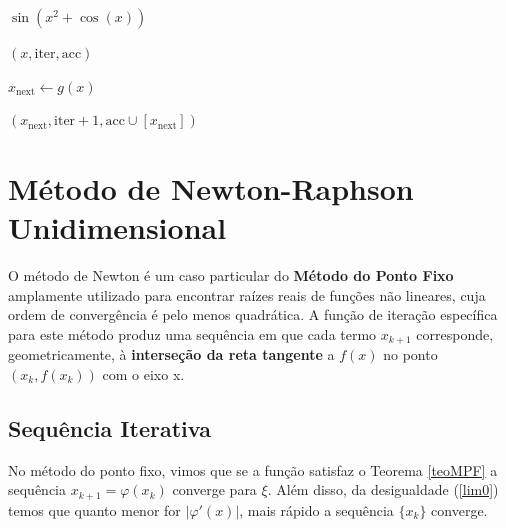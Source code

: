 \begin{algorithm}[H]
    \caption{Método do Ponto Fixo Recursivo}
    \label{alg:pontofixo_funcional}
    \begin{algorithmic}[1]
        \State \Return $\sin(x^2 + \cos(x))$
        \EndFunction


         
        \State \Return $(x, \text{iter}, \text{acc})$ 
        \EndIf

        \State $x_{\text{next}} \gets g(x)$

        \State \Return $(x_{\text{next}}, \text{iter} + 1, \text{acc} \cup [x_{\text{next}}])$ 
        \Else
        \State \Return {} 
        \EndIf
        \EndFunction

        \State \Return {} 
        \EndProcedure
    \end{algorithmic}
\end{algorithm}

\section{Método de Newton-Raphson Unidimensional}\label{sec:NR1d}




O método de Newton é um caso particular do \textbf{Método do Ponto Fixo}
amplamente utilizado para encontrar raízes reais de funções não lineares, cuja
ordem de convergência é pelo menos quadrática. A função de iteração específica
para este método produz uma sequência em que cada termo $x_{k+1}$ corresponde,
geometricamente, à \textbf{interseção da reta tangente} a $f(x)$ no ponto
$(x_k, f(x_k))$ com o eixo x. %

\subsection{Sequência Iterativa}
No método do ponto fixo, vimos que se a função satisfaz o Teorema \ref{teoMPF} a sequência $x_{k+1} = \varphi(x_k)$ converge para $\xi$. Além disso, da desigualdade (\ref{lim0}) temos que quanto menor for $|\varphi'(x)|$, mais rápido a sequência $\{x_k\}$ converge.

